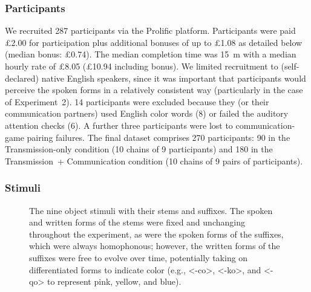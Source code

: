 \documentclass[doc,biblatex]{apa7}
\begin{document}
\subsubsection{Participants}

We recruited 287 participants via the Prolific platform. Participants were paid £2.00 for participation plus additional bonuses of up to £1.08 as detailed below (median bonus: £0.74). The median completion time was 15~m with a median hourly rate of £8.05 (£10.94 including bonus). We limited recruitment to (self-declared) native English speakers, since it was important that participants would perceive the spoken forms in a relatively consistent way (particularly in the case of Experiment~2). 14 participants were excluded because they (or their communication partners) used English color words (8) or failed the auditory attention checks (6). A further three participants were lost to communication-game pairing failures. The final dataset comprises 270 participants: 90 in the Transmission-only condition (10 chains of 9 participants) and 180 in the Transmission~+ Communication condition (10 chains of 9 pairs of participants).

\subsubsection{Stimuli}

	\begin{figure}
	\vspace*{2pt}
	\caption{The nine object stimuli with their stems and suffixes. The spoken and written forms of the stems were fixed and unchanging throughout the experiment, as were the spoken forms of the suffixes, which were always homophonous; however, the written forms of the suffixes were free to evolve over time, potentially taking on differentiated forms to indicate color (e.g., <-co>, <-ko>, and <-qo> to represent pink, yellow, and blue).}
	\label{fig02}
	\end{figure}
\end{document}
